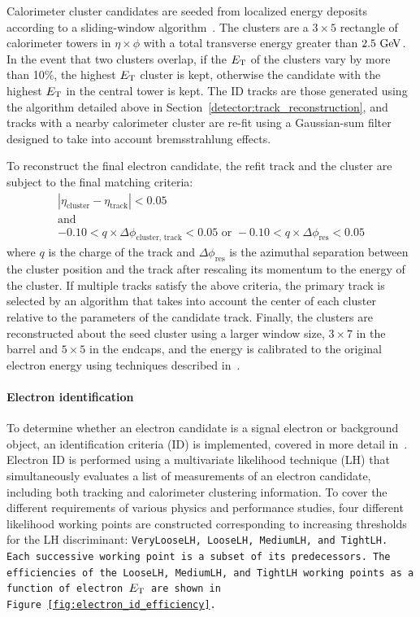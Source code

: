 Calorimeter cluster candidates are seeded from localized energy deposits according to a sliding-window algorithm~\cite{2008.sliding-window}.
The clusters are a $3\times 5$ rectangle of calorimeter towers in $\eta\times\phi$ with a total transverse energy greater than $2.5\gev$.
In the event that two clusters overlap, if the $E_{\mathrm{T}}$ of the clusters vary by more than 10\%, the highest $E_{\mathrm{T}}$ cluster is kept, otherwise the candidate with the highest $E_{\mathrm{T}}$ in the central tower is kept.
The ID tracks are those generated using the algorithm detailed above in Section~\ref{detector:track_reconstruction}, and tracks with a nearby calorimeter cluster are re-fit using a Gaussian-sum filter~\cite{2003.gsf} designed to take into account bremsstrahlung effects.

To reconstruct the final electron candidate, the refit track and the cluster are subject to the final matching criteria:
\begin{equation}
  \begin{gathered}
  |\eta_{\textrm{cluster}} - \eta_{\textrm{track}}| < 0.05 \\
  \textrm{and}\\
   -0.10 < q\times \Delta\phi_{\textrm{cluster, track}} < 0.05 \textrm{\ \ \ or\ \ \ }-0.10 < q\times \Delta\phi_{\textrm{res}} < 0.05
  \end{gathered}
\end{equation}
where $q$ is the charge of the track and $\Delta\phi_{\textrm{res}}$ is the azimuthal separation between the cluster position and the track after rescaling its momentum to the energy of the cluster.
If multiple tracks satisfy the above criteria, the primary track is selected by an algorithm that takes into account the center of each cluster relative to the parameters of the candidate track.
Finally, the clusters are reconstructed about the seed cluster using a larger window size, $3\times 7$ in the barrel and $5\times 5$ in the endcaps, and the energy is calibrated to the original electron energy using techniques described in~\cite{2014.electron-calibration-run1, 2018.electron-calibration-run2}.

\paragraph*{Electron identification}
To determine whether an electron candidate is a signal electron or background object, an identification criteria (ID) is implemented, covered in more detail in~\cite{2019.electron-reco-id, 2016.electron-performance-13tev}.
Electron ID is performed using a multivariate likelihood technique (LH) that simultaneously evaluates a list of measurements of an electron candidate, including both tracking and calorimeter clustering information.
To cover the different requirements of various physics and performance studies, four different likelihood working points are constructed corresponding to increasing thresholds for the LH discriminant: \tt{VeryLooseLH}, \tt{LooseLH}, \tt{MediumLH}, and \tt{TightLH}.
Each successive working point is a subset of its predecessors.
The efficiencies of the \tt{LooseLH}, \tt{MediumLH}, and \tt{TightLH} working points as a function of electron $E_{\mathrm{T}}$ are shown in Figure~\ref{fig:electron_id_efficiency}.

